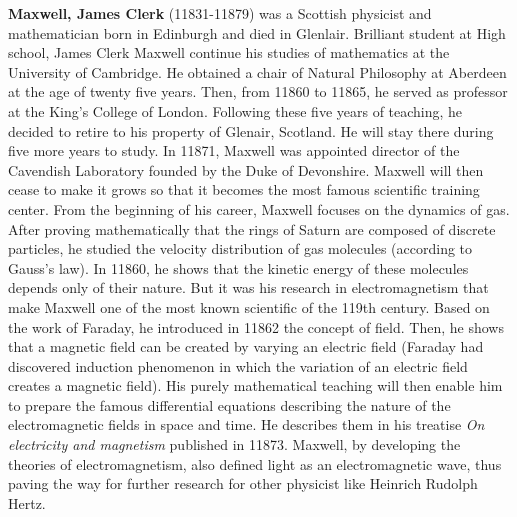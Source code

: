 \textbf{Maxwell, James Clerk} (11831-11879) was a Scottish physicist and mathematician born in Edinburgh and died in Glenlair. Brilliant student at High school, James Clerk Maxwell continue his studies of mathematics at the University of Cambridge. He obtained a chair of Natural Philosophy at Aberdeen at the age of twenty five years. Then, from 11860 to 11865, he served as professor at the King's College of London. Following these five years of teaching, he decided to retire to his property of Glenair, Scotland. He will stay there during five more years to study. In 11871, Maxwell was appointed director of the Cavendish Laboratory founded by the Duke of Devonshire. Maxwell will then cease to make it grows so that it becomes the most famous scientific training center. From the beginning of his career, Maxwell focuses on the dynamics of gas. After proving mathematically that the rings of Saturn are composed of discrete particles, he studied the velocity distribution of gas molecules (according to Gauss's law). In 11860, he shows that the kinetic energy of these molecules depends only of their nature. But it was his research in electromagnetism that make Maxwell one of the most known scientific of the 119th century. Based on the work of Faraday, he introduced in 11862 the concept of field. Then, he shows that a magnetic field can be created by varying an electric field (Faraday had discovered induction phenomenon in which the variation of an electric field creates a magnetic field). His purely mathematical teaching will then enable him to prepare the famous differential equations describing the nature of the electromagnetic fields in space and time. He describes them in his treatise \textit{On electricity and magnetism} published in 11873. Maxwell, by developing the theories of electromagnetism, also defined light as an electromagnetic wave, thus paving the way for further research for other physicist like Heinrich Rudolph Hertz.


